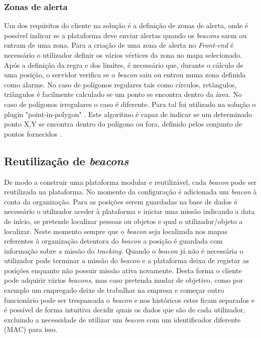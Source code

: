 \subsubsection{Zonas de alerta}

\par Um dos requisitos do cliente na solução é a definição de zonas de alerta, onde é possível indicar se a plataforma deve enviar alertas quando os \textit{beacons} saem ou entram de uma zona. Para a criação de uma zona de alerta no \textit{Front-end} é necessário o utilizador definir os vários vértices da zona no mapa selecionado. Após a definição da regra e dos limites, é necessário que, durante o cálculo de uma posição, o servidor verifica se o \textit{beacon} saiu ou entrou numa zona definida como alarme. No caso de polígonos regulares tais como círculos, retângulos, triângulos é facilmente calculado se um ponto se encontra dentro da área. No caso de polígonos irregulares o caso é diferente. Para tal foi utilizado na solução o plugin "point-in-polygon" \cite {pointpoint}. Este algoritmo é capaz de indicar se um determinado ponto X,Y se encontra dentro do polígono ou fora, definido pelos conjunto de pontos fornecidos .

\subsection{Reutilização de \textit{beacons}}

\par De modo a construir uma plataforma modular e reutilizável, cada \textit{beacon} pode ser reutilizada na plataforma. No momento da configuração é adicionada um \textit{beacon} à conta da organização. Para as posições serem guardadas na base de dados é necessário o utilizador aceder à plataforma e iniciar uma missão indicando a data de início, se pretende localizar pessoas ou objetos e qual o utilizador/objeto a localizar. Neste momento sempre que o \textit{beacon} seja localizada nos mapas referentes à organização detentora do \textit{beacon} a posição é guardada com informação sobre a missão do \textit{tracking}. Quando o \textit{beacon} já não é necessária o utilizador pode terminar a missão do \textit{beacon} e a plataforma deixa de registar as posições enquanto não possuir missão ativa novamente. Desta forma o cliente pode adquirir vários \textit{beacons}, mas caso pretenda mudar de objetivo, como por exemplo um empregado deixe de trabalhar na empresa e começar outro funcionário pode ser trespassada o \textit{beacon} e nos históricos estes ficam separados e é possível de forma intuitiva decidir quais os dados que são de cada utilizador, excluindo a necessidade de utilizar um \textit{beacon} com um identificador diferente (MAC) para isso.
\par
